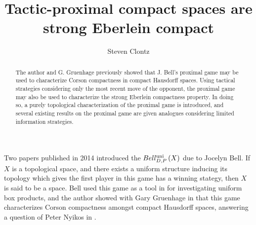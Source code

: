 \documentclass{amsart}
\theoremstyle{definition}
\begin{document}
\title{Tactic-proximal compact spaces are strong Eberlein compact}




\author{Steven Clontz}
\address{Department of Mathematics and Statistics, UNC Charlotte,
Charlotte, NC 28262}




\begin{abstract}
  The author and G. Gruenhage previously showed that J. Bell's proximal game
  may be used to characterize Corson compactness in compact Hausdorff spaces.
  Using tactical strategies considering only the most recent
  move of the opponent, the proximal game may also be
  used to characterize the strong Eberlein compactness property.
  In doing so, a purely topological characterization of the proximal game
  is introduced, and several existing results on
  the proximal game are given
  analogues considering limited information strategies.
\end{abstract}


\maketitle

  Two papers published in 2014 introduced the
  \(Bell_{D,P}^{\textrm{uni}}\left({X}\right)\) due to Jocelyn Bell. If \(X\) is a
  topological space, and there exists a uniform structure inducing its topology
  which gives the first player in this game has a winning stategy,
  then \(X\) is said to be a  space. Bell used this
  game as a tool in \cite{MR3239205} for investigating uniform box products,
  and the author showed with Gary Gruenhage in \cite{MR3227201} that
  this game characterizes Corson compactness amongst compact Hausdorff spaces,
  answering a question of Peter Nyikos in \cite{nyikosProximalPreprint}.
\end{document}
